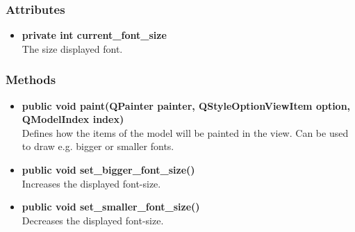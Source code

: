 \subsubsection{Attributes}
\begin{itemize}
  \item \textbf{private int current\_font\_size}\\
  The size displayed font.
\end{itemize}
\subsubsection{Methods}
\begin{itemize}
  \item \textbf{public void paint(QPainter painter, QStyleOptionViewItem option,
  QModelIndex index)}\\
  Defines how the items of the model will be painted in the view. Can be used to draw e.g. bigger or smaller fonts.
  \item \textbf{public void set\_bigger\_font\_size()}\\
  Increases the displayed font-size.
  \item \textbf{public void set\_smaller\_font\_size()}\\
  Decreases the displayed font-size.
\end{itemize}

\newpage
